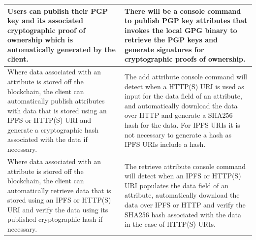 \documentclass[a4paper]{report}
\begin{document}
\begin{longtable}{|p{5.5cm}|p{5.5cm}|}
		Users can publish their PGP key and its associated cryptographic proof of ownership which is automatically generated by the client. & There will be a console command to publish PGP key attributes that invokes the local GPG binary to retrieve the PGP keys and generate signatures for cryptographic proofs of ownership. \\ \hline
		Where data associated with an attribute is stored off the blockchain, the client can automatically publish attributes with data that is stored using an IPFS or HTTP(S) URI and generate a cryptographic hash associated with the data if necessary. & The add attribute console command will detect when a HTTP(S) URI is used as input for the data field of an attribute, and automatically download the data over HTTP and generate a SHA256 hash for the data. For IPFS URIs it is not necessary to generate a hash as IPFS URIs include a hash. \\ \hline
		Where data associated with an attribute is stored off the blockchain, the client can automatically retrieve data that is stored using an IPFS or HTTP(S) URI and verify the data using its published cryptographic hash if necessary. & The retrieve attribute console command will detect when an IPFS or HTTP(S) URI populates the data field of an attribute, automatically download the data over IPFS or HTTP and verify the SHA256 hash associated with the data in the case of HTTP(S) URIs. \\ \hline
	\end{longtable}
	
\end{document}
